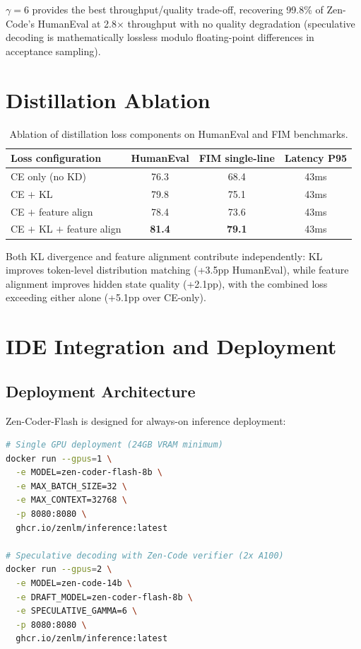 \documentclass[11pt,a4paper]{article}
\begin{document}
$\gamma=6$ provides the best throughput/quality trade-off, recovering 99.8\% of Zen-Code's
HumanEval at 2.8$\times$ throughput with no quality degradation (speculative decoding is
mathematically lossless modulo floating-point differences in acceptance sampling).

\section{Distillation Ablation}

\begin{table}[H]
\centering
\caption{Ablation of distillation loss components on HumanEval and FIM benchmarks.}
\label{tab:ablation}
\begin{tabular}{lccc}
\toprule
\textbf{Loss configuration} & \textbf{HumanEval} & \textbf{FIM single-line} & \textbf{Latency P95} \\
\midrule
CE only (no KD)              & 76.3 & 68.4 & 43ms \\
CE $+$ KL                    & 79.8 & 75.1 & 43ms \\
CE $+$ feature align         & 78.4 & 73.6 & 43ms \\
CE $+$ KL $+$ feature align  & \textbf{81.4} & \textbf{79.1} & 43ms \\
\bottomrule
\end{tabular}
\end{table}

Both KL divergence and feature alignment contribute independently: KL improves token-level
distribution matching (+3.5pp HumanEval), while feature alignment improves hidden state
quality (+2.1pp), with the combined loss exceeding either alone (+5.1pp over CE-only).

\section{IDE Integration and Deployment}

\subsection{Deployment Architecture}

Zen-Coder-Flash is designed for always-on inference deployment:

\begin{lstlisting}[language=bash, caption={Starting a Zen-Coder-Flash inference server.}]
# Single GPU deployment (24GB VRAM minimum)
docker run --gpus=1 \
  -e MODEL=zen-coder-flash-8b \
  -e MAX_BATCH_SIZE=32 \
  -e MAX_CONTEXT=32768 \
  -p 8080:8080 \
  ghcr.io/zenlm/inference:latest

# Speculative decoding with Zen-Code verifier (2x A100)
docker run --gpus=2 \
  -e MODEL=zen-code-14b \
  -e DRAFT_MODEL=zen-coder-flash-8b \
  -e SPECULATIVE_GAMMA=6 \
  -p 8080:8080 \
  ghcr.io/zenlm/inference:latest
\end{lstlisting}
\end{document}
